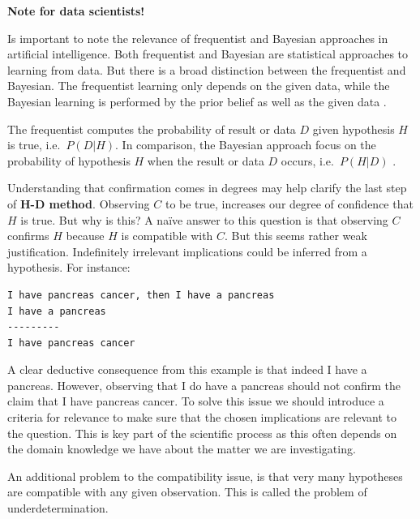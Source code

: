\documentclass[
]{book}
\begin{document}
\begin{tipbox}

\textbf{Note for data scientists!}

Is important to note the relevance of frequentist and Bayesian approaches in artificial intelligence. Both frequentist and Bayesian are statistical approaches to learning from data. But there is a broad distinction between the frequentist and Bayesian. The frequentist learning only depends on the given data, while the Bayesian learning is performed by the prior belief as well as the given data \citep{jun2016frequentist}.

The frequentist computes the probability of result or data \(D\) given hypothesis \(H\) is true, i.e.~\(P(D|H)\). In comparison, the Bayesian approach focus on the probability of hypothesis \(H\) when the result or data \(D\) occurs, i.e.~\(P(H|D)\) \citep{orloffcomparison}.

\end{tipbox}

Understanding that confirmation comes in degrees may help clarify the last step of \textbf{H-D method}. Observing \(C\) to be true, increases our degree of confidence that \(H\) is true. But why is this? A naïve answer to this question is that observing \(C\) confirms \(H\) because \(H\) is compatible with \(C\). But this seems rather weak justification. Indefinitely irrelevant implications could be inferred from a hypothesis. For instance:

\begin{verbatim}
I have pancreas cancer, then I have a pancreas
I have a pancreas    
---------
I have pancreas cancer
\end{verbatim}

A clear deductive consequence from this example is that indeed I have a pancreas. However, observing that I do have a pancreas should not confirm the claim that I have pancreas cancer. To solve this issue we should introduce a criteria for relevance to make sure that the chosen implications are relevant to the question. This is key part of the scientific process as this often depends on the domain knowledge we have about the matter we are investigating.

An additional problem to the compatibility issue, is that very many hypotheses are compatible with any given observation. This is called the problem of underdetermination.
\end{document}
